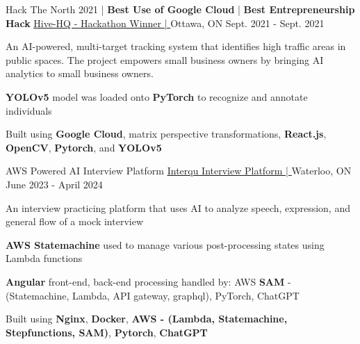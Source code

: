 \begin{cventries}
	\cventry
	{Hack The North 2021 | \textbf{Best Use of Google Cloud} | \textbf{Best Entrepreneurship Hack}} %
	{\underline{\href{https://devpost.com/software/hive-hq}{Hive-HQ - Hackathon Winner | \ExternalLink}}} %
	{Ottawa, ON} %
	{Sept. 2021 - Sept. 2021} %
	{
		\begin{cvitems} %
			\item {An AI-powered, multi-target tracking system that identifies high traffic areas in public spaces. The project empowers small business owners by bringing AI analytics to small business owners.}
			\item {\textbf{YOLOv5} model was loaded onto \textbf{PyTorch} to recognize and annotate individuals}
			\item {Built using \textbf{Google Cloud}, matrix perspective transformations, \textbf{React.js}, \textbf{OpenCV}, \textbf{Pytorch}, and \textbf{YOLOv5}}
		\end{cvitems}
	}


	\cventry
	{AWS Powered AI Interview Platform}
	{\underline{\href{https://github.com/Interqu}{Interqu Interview Platform | \ExternalLink}}} %
	{Waterloo, ON} %
	{June 2023 - April 2024} %
	{
		\begin{cvitems} %
			\item {An interview practicing platform that uses AI to analyze speech, expression, and general flow of a mock interview}
			\item {\textbf{AWS Statemachine} used to manage various post-processing states using Lambda functions}
			\item {\textbf{Angular} front-end, back-end processing handled by: AWS \textbf{SAM} - (Statemachine, Lambda, API gateway, graphql), PyTorch, ChatGPT}
			\item {Built using \textbf{Nginx}, \textbf{Docker}, \textbf{AWS - (Lambda, Statemachine, Stepfunctions, SAM)}, \textbf{Pytorch}, \textbf{ChatGPT}}
		\end{cvitems}
	}


\end{cventries}
